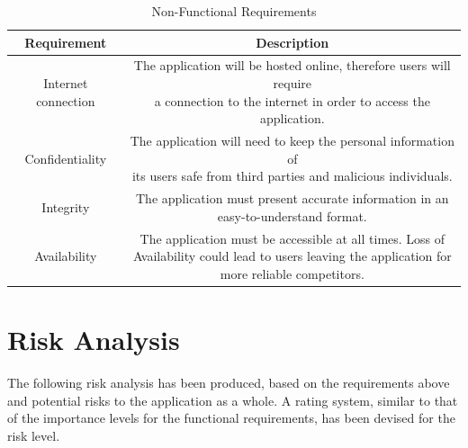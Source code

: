     \begin{table}[h]
        \centering
        \begin{tabular}{|c|c|}
            \hline
            Requirement & Description\\
            \hline
            \hline
            Internet connection & \makecell{The application will be hosted online, therefore users will require\\a connection to the internet in order to access the application.}\\
            \hline
            Confidentiality & \makecell{The application will need to keep the personal information of\\ its users safe from third parties and malicious individuals.}\\
            \hline
            Integrity & \makecell{The application must present accurate information in an\\ easy-to-understand format.}\\
            \hline
            Availability & \makecell{The application must be accessible at all times. Loss of\\ Availability could lead to users leaving the application for\\ more reliable competitors.}\\
            \hline
        \end{tabular}
        \caption{Non-Functional Requirements}
    \end{table}

\section{Risk Analysis}
    The following risk analysis has been produced, based on the requirements above and potential risks to the application as a whole. A rating system, similar to that of the importance levels for the functional requirements, has been devised for the risk level.\\

